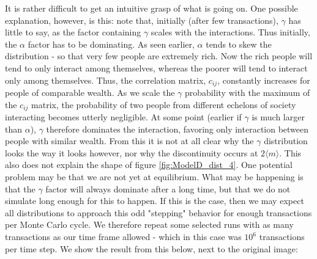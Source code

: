 \documentclass[a4paper, 10pt]{article}
\begin{document}
\linebreak
It is rather difficult to get an intuitive grasp of what is going on. One possible explanation, however, is this: note that, initially (after few transactions), $\gamma$ has little to say, as the factor containing $\gamma$ scales with the interactions. Thus initially, the $\alpha$ factor has to be dominating. As seen earlier, $\alpha$ tends to skew the distribution - so that very few people are extremely rich. Now the rich people will tend to only interact among themselves, whereas the poorer will tend to interact only among themselves. Thus, the correlation matrix, $c_{ij}$, constantly increases for people of comparable wealth. As we scale the $\gamma$ probability with the maximum of the $c_{ij}$ matrix, the probability of two people from different echelons of society interacting becomes utterly negligible. At some point (earlier if $\gamma$ is much larger than $\alpha$), $\gamma$ therefore dominates the interaction, favoring only interaction between people with similar wealth. From this it is not at all clear why the $\gamma$ distribution looks the way it looks however, nor why the discontinuity occurs at $2\langle m \rangle$. This also does not explain the shape of figure \ref{fig:ModelD_dist_4}.
\linebreak
One potential problem may be that we are not yet at equilibrium. What may be happening is that the $\gamma$  factor will always dominate after a long time, but that we do not simulate long enough for this to happen. If this is the case, then we may expect all distributions to approach this odd "stepping" behavior for enough transactions per Monte Carlo cycle. We therefore repeat some selected runs with as many transactions as our time frame allowed - which in this case was $10^6$ transactions per time step. We show the result from this below, next to the original image:\\
\linebreak
\end{document}
